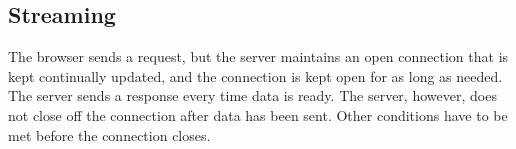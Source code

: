 \subsection{Streaming}


The browser sends a request, but the server maintains an open connection that is kept continually updated, and the connection is kept open for as long as needed. The server sends a response every time data is ready. The server, however, does not close off the connection after data has been sent. Other conditions have to be met before the connection closes.\cite{lubbersgreco}